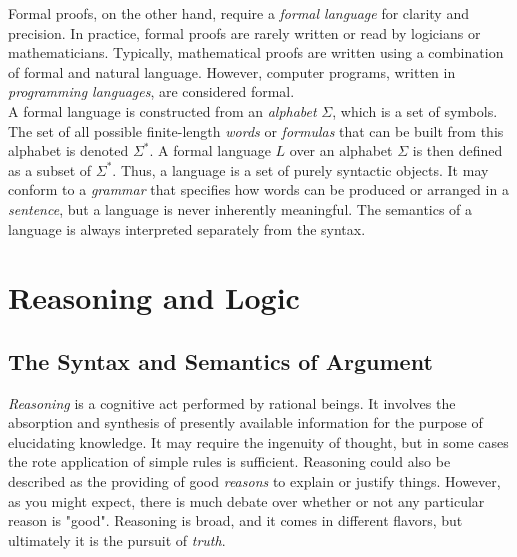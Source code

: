 Formal proofs, on the other hand, require a \textit{formal language} for clarity and precision. In practice, formal proofs are rarely written or read by logicians or mathematicians. Typically, mathematical proofs are written using a combination of formal and natural language. However, computer programs, written in \textit{programming languages}, are considered formal. \\

A formal language is constructed from an \textit{alphabet} $\Sigma$, which is a set of symbols. The set of all possible finite-length \textit{words} or \textit{formulas} that can be built from this alphabet is denoted $\Sigma^*$. A formal language $L$ over an alphabet $\Sigma$ is then defined as a subset of $\Sigma^*$. Thus, a language is a set of purely syntactic objects. It may conform to a \textit{grammar} that specifies how words can be produced or arranged in a \textit{sentence}, but a language is never inherently meaningful. The semantics of a language is always interpreted separately from the syntax. \\


\section{Reasoning and Logic}



\subsection{The Syntax and Semantics of Argument}

\textit{Reasoning} is a cognitive act performed by rational beings. It involves the absorption and synthesis of presently available information for the purpose of elucidating knowledge. It may require the ingenuity of thought, but in some cases the rote application of simple rules is sufficient. Reasoning could also be described as the providing of good \textit{reasons} to explain or justify things. However, as you might expect, there is much debate over whether or not any particular reason is "good". Reasoning is broad, and it comes in different flavors, but ultimately it is the pursuit of \textit{truth}. \\

